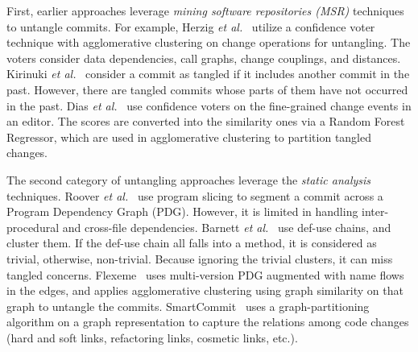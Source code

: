 First, earlier approaches leverage {\em mining software repositories
  (MSR)} techniques to untangle commits. For example, Herzig {\em et
  al.}~\cite{kim-msr13,kim-emse16} utilize a confidence voter
technique with agglomerative clustering on change
operations for untangling.
The voters consider data dependencies, call graphs, change
couplings, and distances.
%
Kirinuki {\em et al.}~\cite{higo-apsec16, higo-icpc14} consider a
commit as tangled if it includes another commit in the past. However,
there are tangled commits whose parts of them have not occurred
in the past.
%
Dias {\em et al.}~\cite{dias-saner15} use confidence voters
on the fine-grained change events in an editor. The scores are converted
into the similarity ones via a Random Forest Regressor, which are used
in agglomerative clustering to partition tangled changes.

The second category of untangling approaches leverage the {\em static
analysis} techniques. Roover {\em et
  al.}~\cite{roover-scam18} use program slicing to segment a commit
across a Program Dependency Graph (PDG).  However, it is limited in
handling inter-procedural and cross-file dependencies. Barnett {\em et
  al.}~\cite{barnett-icse15} use def-use chains, and cluster them. If
the def-use chain all falls into a method, it is considered as
trivial, otherwise, non-trivial. Because ignoring the trivial
clusters, it can miss tangled concerns. Flexeme~\cite{flexeme-fse20}
uses multi-version PDG augmented with name flows in the edges, and
applies agglomerative clustering using graph similarity on that graph
to untangle the commits. SmartCommit~\cite{smartcommit-fse21} uses a
graph-partitioning algorithm on a graph representation to capture the
relations among code changes (hard and soft links, refactoring links,
cosmetic links, etc.).


